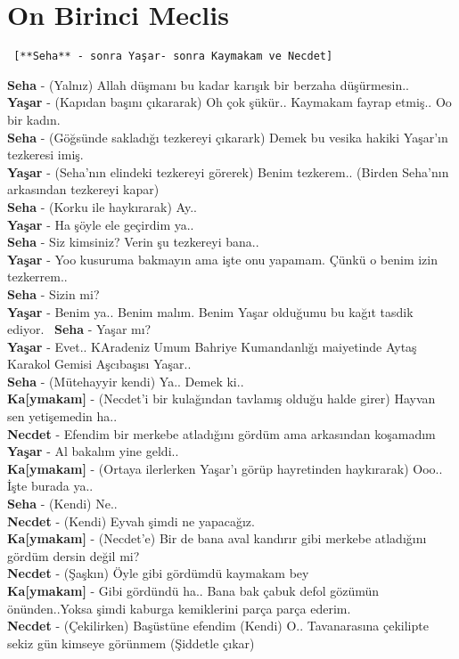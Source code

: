 \documentclass[]{book}
\begin{document}
\hypertarget{on-birinci-meclis-1}{%
\section{On Birinci Meclis}\label{on-birinci-meclis-1}}

\begin{verbatim}
 [**Seha** - sonra Yaşar- sonra Kaymakam ve Necdet]
\end{verbatim}

\textbf{Seha} - (Yalnız) Allah düşmanı bu kadar karışık bir berzaha düşürmesin..\\
\textbf{Yaşar} - (Kapıdan başını çıkararak) Oh çok şükür.. Kaymakam fayrap etmiş.. Oo bir kadın.\\
\textbf{Seha} - (Göğsünde sakladığı tezkereyi çıkarark) Demek bu vesika hakiki Yaşar'ın tezkeresi imiş.\\
\textbf{Yaşar} - (Seha'nın elindeki tezkereyi görerek) Benim tezkerem.. (Birden Seha'nın arkasından tezkereyi kapar)\\
\textbf{Seha} - (Korku ile haykırarak) Ay..\\
\textbf{Yaşar} - Ha şöyle ele geçirdim ya..\\
\textbf{Seha} - Siz kimsiniz? Verin şu tezkereyi bana..\\
\textbf{Yaşar} - Yoo kusuruma bakmayın ama işte onu yapamam. Çünkü o benim izin tezkerrem..\\
\textbf{Seha} - Sizin mi?\\
\textbf{Yaşar} - Benim ya.. Benim malım. Benim Yaşar olduğumu bu kağıt tasdik ediyor.~
\textbf{Seha} - Yaşar mı?\\
\textbf{Yaşar} - Evet.. KAradeniz Umum Bahriye Kumandanlığı maiyetinde Aytaş Karakol Gemisi Aşcıbaşısı Yaşar..\\
\textbf{Seha} - (Mütehayyir kendi) Ya.. Demek ki..\\
\textbf{Ka{[}ymakam{]}} - (Necdet'i bir kulağından tavlamış olduğu halde girer) Hayvan sen yetişemedin ha..\\
\textbf{Necdet} - Efendim bir merkebe atladığını gördüm ama arkasından koşamadım\\
\textbf{Yaşar} - Al bakalım yine geldi..\\
\textbf{Ka{[}ymakam{]}} - (Ortaya ilerlerken Yaşar'ı görüp hayretinden haykırarak) Ooo.. İşte burada ya..\\
\textbf{Seha} - (Kendi) Ne..\\
\textbf{Necdet} - (Kendi) Eyvah şimdi ne yapacağız.\\
\textbf{Ka{[}ymakam{]}} - (Necdet'e) Bir de bana aval kandırır gibi merkebe atladığını gördüm dersin değil mi?\\
\textbf{Necdet} - (Şaşkın) Öyle gibi gördümdü kaymakam bey\\
\textbf{Ka{[}ymakam{]}} - Gibi gördündü ha.. Bana bak çabuk defol gözümün önünden..Yoksa şimdi kaburga kemiklerini parça parça ederim.\\
\textbf{Necdet} - (Çekilirken) Başüstüne efendim (Kendi) O.. Tavanarasına çekilipte sekiz gün kimseye görünmem (Şiddetle çıkar)\\
\end{document}
